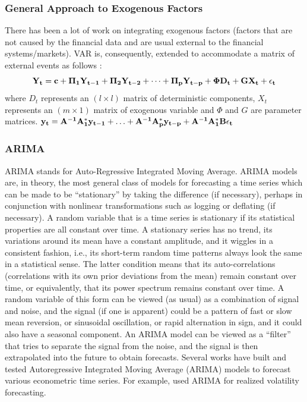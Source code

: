 \subsubsection{General Approach to Exogenous Factors}
There has been a lot of work on integrating exogenous factors (factors that are not caused by the financial data and are usual external to the financial systems/markets). VAR is, consequently, extended to accommodate a matrix of external events as follows \cite{VARX}: 
$$\bf{Y}_t=\bf{c}+\bf{\Pi}_1\bf{Y}_{t-1}+\bf{\Pi}_2\bf{Y}_{t-2}+\cdots+\bf{\Pi}_p\bf{Y}_{t-p}+\bf{\Phi D}_t+\bf{GX}_t+\epsilon_t$$
where $D_t$ represents an $(l \times l)$ matrix of deterministic components, $X_t$ represents an $(m \times 1)$ matrix of exogenous variable and $\Phi$ and $G$ are parameter matrices.
$\bf{y}_t=A^{-1}A^*_1\bf{y}_{t-1}+\ldots+A^{-1}A^*_p\bf{y}_{t-p}+A^{-1}A^*_1B\epsilon_t$

\subsubsection{ARIMA}
ARIMA stands for Auto-Regressive Integrated Moving Average. ARIMA models are, in theory, the most general class of models for forecasting a time series which can be made to be “stationary” by taking the difference (if necessary), perhaps in conjunction with nonlinear transformations such as logging or deflating (if necessary). A random variable that is a time series is stationary if its statistical properties are all constant over time.  A stationary series has no trend, its variations around its mean have a constant amplitude, and it wiggles in a consistent fashion, i.e., its short-term random time patterns always look the same in a statistical sense. The latter condition means that its auto-correlations (correlations with its own prior deviations from the mean) remain constant over time, or equivalently, that its power spectrum remains constant over time.  A random variable of this form can be viewed (as usual) as a combination of signal and noise, and the signal (if one is apparent) could be a pattern of fast or slow mean reversion, or sinusoidal oscillation, or rapid alternation in sign, and it could also have a seasonal component.  An ARIMA model can be viewed as a “filter” that tries to separate the signal from the noise, and the signal is then extrapolated into the future to obtain forecasts. Several works have built and tested Autoregressive Integrated Moving Average (ARIMA) models to forecast various econometric time series. For example, \cite{Vol} used ARIMA for realized volatility forecasting.

